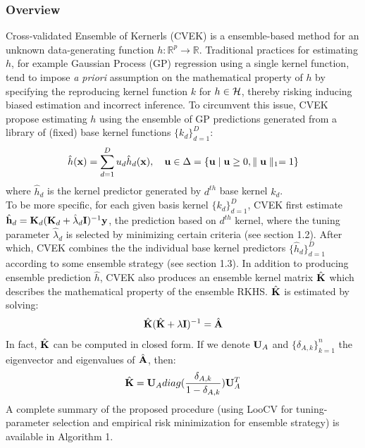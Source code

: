 \documentclass[11pt]{article}
\begin{document}
\subsubsection{{Overview}}
Cross-validated Ensemble of Kernerls (CVEK) \citep{liu_robust_2017} is a ensemble-based method for an unknown data-generating function $h: \mathbb{R}^p\rightarrow \mathbb{R}$. Traditional practices for estimating $h$, for example  Gaussian Process (GP) regression using a single kernel function, tend to impose \textit{a priori} assumption on the mathematical property of $h$ by specifying the reproducing kernel function $k$ for $h \in {\cal H}$, thereby risking inducing biased estimation and incorrect inference. To circumvent this issue, CVEK propose   estimating $h$ using the ensemble of GP predictions generated from a library of (fixed) base kernel functions $\{k_d\}_{d=1}^D$:
\begin{align}
\hat{h}({\bf x})=\sum_{d=1}^D u_d\hat{h}_d({\bf x}), \quad {\bf u} \in \Delta=\{{\bf u} \mid {\bf u} \geq 0, \parallel {\bf u} \parallel_1=1\}
\end{align}
where $\hat{h}_d$ is the kernel predictor generated by $d^{th}$ base kernel $k_d$.\\
To be more specific, for each given basis kernel $\{k_d\}_{d=1}^D$, CVEK first estimate $\hat{{\bf h}}_d={\bf K}_d({\bf K}_d+\hat{\lambda}_d{\bf I})^{-1}{\bf y}$, the prediction based on $d^{th}$ kernel, where the tuning parameter $\hat{\lambda}_d$ is selected by minimizing certain criteria (see section 1.2). After which, CVEK combines the the individual base kernel predictors $\{\hat{h}_d\}_{d=1}^D$ according to some ensemble strategy (see section 1.3). In addition to producing ensemble prediction $\hat{h}$, CVEK also produces an ensemble kernel matrix $\hat{{\bf K}}$ which describes the mathematical property of the ensemble RKHS. $\hat{{\bf K}}$ is estimated by solving:
\begin{align*}
\hat{{\bf K}}(\hat{{\bf K}}+\lambda {\bf I})^{-1}=\hat{{\bf A}}
\end{align*}
In fact, $\hat{{\bf K}}$ can be computed in closed form. If we denote ${\bf U}_A$ and $\{\delta_{A,k}\}_{k=1}^n$ the eigenvector and eigenvalues of $\hat{{\bf A}}$, then:
\begin{align*}
\hat{{\bf K}}={\bf U}_A diag(\frac{\delta_{A,k}}{1-\delta_{A,k}}){\bf U}_A^T
\end{align*}
A complete summary of the proposed procedure (using LooCV for tuning-parameter selection and empirical risk minimization for ensemble strategy) is available in Algorithm 1.
\end{document}
